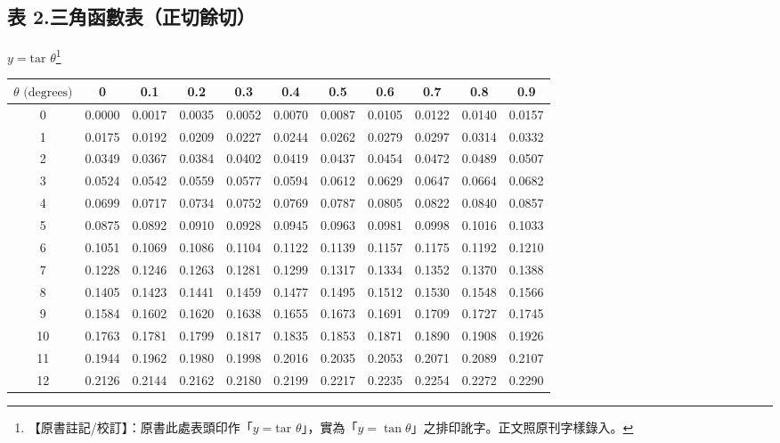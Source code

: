 \subsection*{表 2.\quad 三角函數表（正切餘切）}
\begin{center} $y = \text{tar }\theta$\label{note:b3-a3-p287-tar}\footnote{【原書註記/校訂】：原書此處表頭印作「$y = \text{tar }\theta$」，實為「$y = \tan\theta$」之排印訛字。正文照原刊字樣錄入。} \end{center}
{\centering\fontsize{7.5pt}{8.8pt}\selectfont\setlength{\tabcolsep}{3.5pt}\renewcommand{\arraystretch}{0.96}
\begin{tabular}{|c|cccccccccc|}
\hline
$\theta\text{ (degrees)}$ & 0 & 0.1 & 0.2 & 0.3 & 0.4 & 0.5 & 0.6 & 0.7 & 0.8 & 0.9 \\ \hline
0 & 0.0000 & 0.0017 & 0.0035 & 0.0052 & 0.0070 & 0.0087 & 0.0105 & 0.0122 & 0.0140 & 0.0157 \\
1 & 0.0175 & 0.0192 & 0.0209 & 0.0227 & 0.0244 & 0.0262 & 0.0279 & 0.0297 & 0.0314 & 0.0332 \\
2 & 0.0349 & 0.0367 & 0.0384 & 0.0402 & 0.0419 & 0.0437 & 0.0454 & 0.0472 & 0.0489 & 0.0507 \\
3 & 0.0524 & 0.0542 & 0.0559 & 0.0577 & 0.0594 & 0.0612 & 0.0629 & 0.0647 & 0.0664 & 0.0682 \\
4 & 0.0699 & 0.0717 & 0.0734 & 0.0752 & 0.0769 & 0.0787 & 0.0805 & 0.0822 & 0.0840 & 0.0857 \\
\hline
5 & 0.0875 & 0.0892 & 0.0910 & 0.0928 & 0.0945 & 0.0963 & 0.0981 & 0.0998 & 0.1016 & 0.1033 \\
6 & 0.1051 & 0.1069 & 0.1086 & 0.1104 & 0.1122 & 0.1139 & 0.1157 & 0.1175 & 0.1192 & 0.1210 \\
7 & 0.1228 & 0.1246 & 0.1263 & 0.1281 & 0.1299 & 0.1317 & 0.1334 & 0.1352 & 0.1370 & 0.1388 \\
8 & 0.1405 & 0.1423 & 0.1441 & 0.1459 & 0.1477 & 0.1495 & 0.1512 & 0.1530 & 0.1548 & 0.1566 \\
9 & 0.1584 & 0.1602 & 0.1620 & 0.1638 & 0.1655 & 0.1673 & 0.1691 & 0.1709 & 0.1727 & 0.1745 \\
\hline
10 & 0.1763 & 0.1781 & 0.1799 & 0.1817 & 0.1835 & 0.1853 & 0.1871 & 0.1890 & 0.1908 & 0.1926 \\
11 & 0.1944 & 0.1962 & 0.1980 & 0.1998 & 0.2016 & 0.2035 & 0.2053 & 0.2071 & 0.2089 & 0.2107 \\
12 & 0.2126 & 0.2144 & 0.2162 & 0.2180 & 0.2199 & 0.2217 & 0.2235 & 0.2254 & 0.2272 & 0.2290 \\

\end{tabular}}
